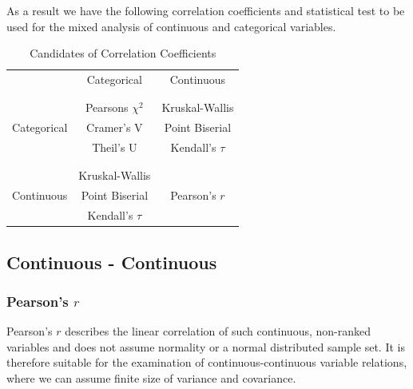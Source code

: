 \documentclass[a4paper,12pt]{report}
\begin{document}
\bigskip

As a result we have the following correlation coefficients and statistical test to be used for the mixed analysis of continuous and categorical variables. 

\bigskip

\begin{table}[ht]
	\centering
	\begin{tabular}{c|c|c}
					& Categorical 		& Continuous\\
		\\[-1em]
		\hline
		\\[-1em]
		 			& Pearsons $\chi^2$ 	& Kruskal-Wallis	\\
		Categorical	& Cramer’s V 		& Point Biserial\\
					& Theil’s U			& Kendall's $\tau$\\
		\\[-1em]
		\hline
		\\[-1em]
					& Kruskal-Wallis	  			& \\
		Continuous	& Point Biserial	& Pearson's $r$\\
				& Kendall's $\tau$		& \\
	\end{tabular}
	\caption{\label{tab:table-name}Candidates of Correlation Coefficients}
\end{table}

\subsection{Continuous - Continuous}

\subsubsection{Pearson's $r$}
\label{correlation_pearson}
Pearson's $r$ describes the linear correlation of such continuous, non-ranked variables and does not assume normality or a normal distributed sample set. It is therefore suitable for the examination of continuous-continuous variable relations, where we can assume finite size of variance and covariance. \cite{BenestyChenHuang2009,Sulthan2018}
 
\end{document}
